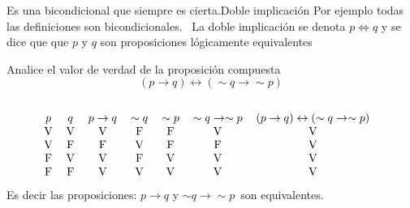 \begin{ideas}{Es una bicondicional que siempre es cierta.}{Doble implicaci\'on}
Por ejemplo todas las definiciones son bicondicionales.
\nota\ La doble implicaci\'on se denota  $p \Longleftrightarrow q$ y se dice que
que $p$ y $q$ son proposiciones lógicamente equivalentes
\end{ideas}
\begin{ejemplo}{Analice el valor de verdad de la proposición compuesta%
\[
(p\rightarrow q)\leftrightarrow(\sim q\rightarrow\sim p)
\]
}
\solucion\ 
%
\[%
\begin{tabular}
[c]{ccccccc}%
$p$ & $q$ & $p\rightarrow q$ & $\sim q$ & $\sim p$ & $\sim q\rightarrow\sim p$
& $(p\rightarrow q)\leftrightarrow(\sim q\rightarrow\sim p)$\\
V & V & V & F & F & V & V\\
V & F & F & V & F & F & V\\
F & V & V & F & V & V & V\\
F & F & V & V & V & V & V
\end{tabular}
\ \
\]
Es decir las proposiciones: $p\rightarrow q$ y $\sim
q\rightarrow\sim p$\ son equivalentes. 
 \end{ejemplo}

